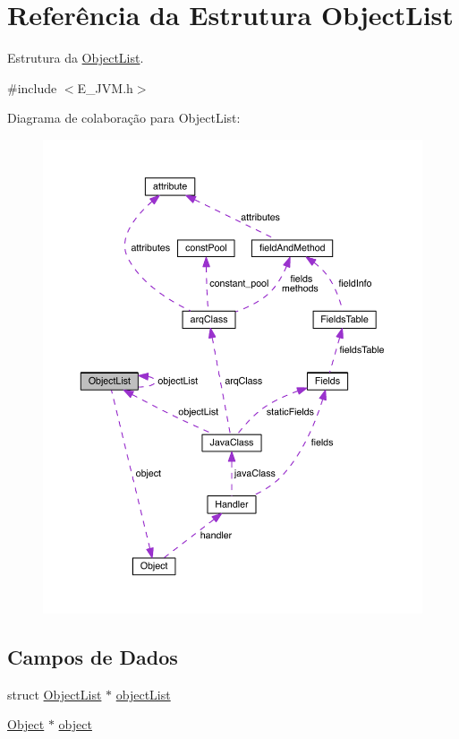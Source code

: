 \hypertarget{struct_object_list}{}\section{Referência da Estrutura Object\+List}
\label{struct_object_list}


Estrutura da \hyperlink{struct_object_list}{Object\+List}.  




{\ttfamily \#include $<$E\+\_\+\+J\+V\+M.\+h$>$}



Diagrama de colaboração para Object\+List\+:\nopagebreak
\begin{figure}[H]
\begin{center}
\leavevmode
\includegraphics[width=350pt]{struct_object_list__coll__graph}
\end{center}
\end{figure}
\subsection*{Campos de Dados}
\begin{DoxyCompactItemize}
\item 
struct \hyperlink{struct_object_list}{Object\+List} $\ast$ \hyperlink{struct_object_list_a7d359d3713e54aec6a628a23ce886aec}{object\+List}
\item 
\hyperlink{struct_object}{Object} $\ast$ \hyperlink{struct_object_list_aae49442726f57917e2d6611c62f1e071}{object}
\end{DoxyCompactItemize}


